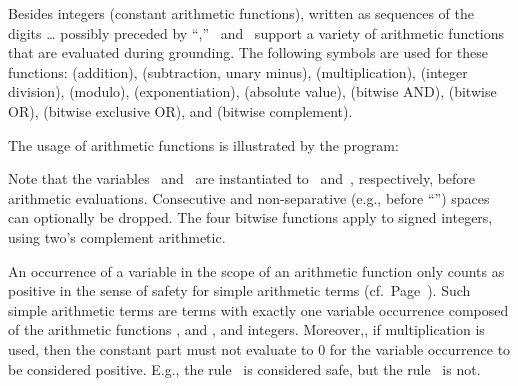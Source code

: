 Besides integers (constant arithmetic functions),
written as sequences of the digits \dots{}
possibly preceded by ``\code{-},''
\gringo\ and \clingo\ support a variety of arithmetic functions that
are evaluated during grounding.
The following symbols are used for these functions:
\code{+} (addition),
\code{-} (subtraction, unary minus),
\code{*} (multiplication),
\code{/} (integer division),
\code{\textbackslash} (modulo),
\code{**} (exponentiation),
\code{|$\cdot$|} (absolute value),
\code{\&} (bitwise AND),
 (bitwise OR),
\code{\^} (bitwise exclusive OR), and
\code{\textasciitilde} (bitwise complement).

\begin{example}\label{ex:arith:fun}
The usage of arithmetic functions is illustrated by the program:%
%

%
Note that the variables~ and~ are instantiated to~ and~,
respectively, before arithmetic evaluations.
Consecutive and non-separative (e.g., before ``\code{(}'')
spaces can optionally be dropped.
The four bitwise functions apply to signed integers,
using two's complement arithmetic. %
\eexample
\end{example}

\begin{note}
An occurrence of a variable in the scope of an arithmetic function
only counts as positive in the sense of safety for simple arithmetic terms (cf.\ Page~\pageref{pg:safe}).
Such simple arithmetic terms are terms with exactly one variable occurrence
composed of the arithmetic functions \code{+}, \code{-} and \code{*}, and integers.
Moreover,,
if multiplication is used, then the constant part must not evaluate to $0$ for the variable occurrence to be considered positive. 
E.g., the rule~
is considered safe, but
the rule~ is not.
%
\end{note}

